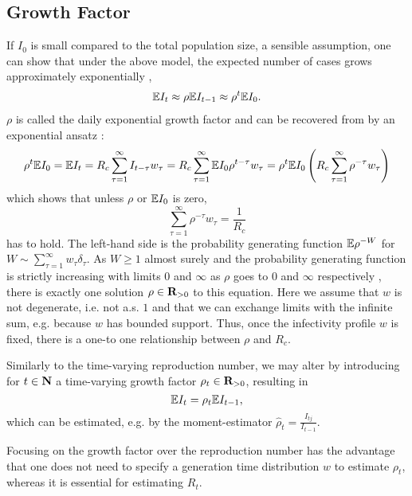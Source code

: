 \subsection{Growth Factor}
\label{subsec:growth_factor}
If $I_{0}$ is small compared to the total population size, a sensible assumption, one can show that under the above model, the expected number of cases grows approximately exponentially \citep[Section 1.2]{Diekmann2013Mathematical}, 
\begin{align}
    \label{eq:exponential-growth}
\mathbb E I_{t} \approx \rho \mathbb E I_{t - 1} \approx \rho^{t} \mathbb E I_{0}.
\end{align}
$\rho$ is called the daily exponential growth factor and can be recovered from  by an exponential ansatz \citep{Wallinga2007How}:
$$
    \rho^{t} \mathbb E I_{0} = \mathbb E I_{t} = R_c \sum_{\tau = 1}^\infty I_{t - \tau}w_{\tau} = R_{c} \sum_{\tau = 1}^\infty \mathbb E I_{0} \rho^{t - \tau} w_{\tau} = \rho^{t} \mathbb E I_{0} \left( R_{c} \sum_{\tau = 1} ^{\infty} \rho^{-\tau}w_{\tau}\right)
$$
which shows that unless $\rho$ or $\mathbb E I_{0}$ is zero, 
$$
    \sum_{\tau = 1}^\infty \rho^{-\tau} w_{\tau} = \frac{1}{R_{c}}
$$
has to hold. The left-hand side is the probability generating function $\mathbb E \rho^{-W}$ for $W \sim \sum_{\tau = 1}^\infty w_{\tau}\delta_{\tau}$. As $W \geq 1$ almost surely and the probability generating function is strictly increasing with limits $0$ and $\infty$ as $\rho$ goes to $0$ and $\infty$ respectively , there is exactly one solution $\rho \in \mathbf R_{> 0}$ to this equation. Here we assume that $w$ is not degenerate, i.e. not a.s. $1$ and  that we can exchange limits with the infinite sum, e.g. because $w$ has bounded support. Thus, once the infectivity profile $w$ is fixed, there is a one-to one relationship between $\rho$ and $R_{c}$. 

Similarly to the time-varying reproduction number, we may alter  by introducing for $t \in \mathbf N$ a time-varying growth factor $\rho_{t} \in \mathbf R_{> 0}$, resulting in 
$$
    \mathbb E I_{t} = \rho_t \mathbb E I_{t - 1},
$$
which can be estimated, e.g. by the moment-estimator $\hat \rho_{t} = \frac{I_{tj}}{I_{t - 1}}$. 

Focusing on the growth factor over the reproduction number has the advantage that one does not need to specify a generation time distribution $w$ to estimate $\rho_{t}$, whereas it is essential for estimating $R_{t}$. 

